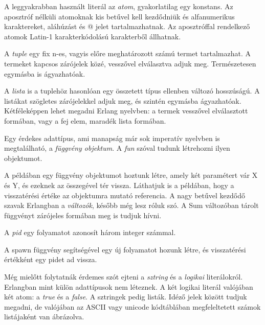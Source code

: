 \documentclass[twoside, a4paper, 12pt]{article}
\begin{document}


A leggyakrabban használt literál az \textit{atom}, gyakorlatilag egy konstans. Az aposztróf nélküli atomoknak kis betűvel kell kezdődniük és alfanumerikus karaktereket, aláhúzást és @ jelet tartalmazhatnak. Az aposztróffal rendelkező atomok Latin-1 karakterkódolású karakterből állhatnak.



A \textit{tuple} egy fix n-es, vagyis előre meghatározott számú termet tartalmazhat. A termeket kapcsos zárójelek közé, vesszővel elválasztva adjuk meg. Természetesen egymásba is ágyazhatóak.



A \textit{lista} is a tuplehöz hasonlóan egy összetett típus ellenben változó hosszúságú. A listákat szögletes zárójelekkel adjuk meg, és szintén egymásba ágyazhatóak. Kétféleképpen lehet megadni Erlang nyelvben: a termek vesszővel elválasztott formában, vagy a fej elem, maradék lista formában.



Egy érdekes adattípus, ami manapság már sok imperatív nyelvben is megtalálható, a \textit{függvény objektum}. A \textit{fun} szóval tudunk létrehozni ilyen objektumot.



A példában egy függvény objektumot hoztunk létre, amely két paramétert vár X és Y, és ezeknek az összegével tér vissza. Láthatjuk is a példában, hogy a visszatérési értéke az objektumra mutató referencia. A nagy betűvel kezdődő szavak Erlangban a \textit{változók}, később még lesz róluk szó. A Sum változóban tárolt függvényt zárójeles formában meg is tudjuk hívni.

A \textit{pid} egy folyamatot azonosít három integer számmal.



A spawn függvény segítségével egy új folyamatot hozunk létre, és visszatérési értékként egy pidet ad vissza.

Még mielőtt folytatnák érdemes szót ejteni a \textit{sztring} és a \textit{logikai} literálokról. Erlangban mint külön adattípusok nem léteznek. A két logikai literál valójában két atom: a \textit{true} és a \textit{false}. A sztringek pedig listák. Idéző jelek között tudjuk megadni, de valójában az ASCII vagy unicode kódtáblában megfeleltetett számok listájaként van ábrázolva.
\end{document}
